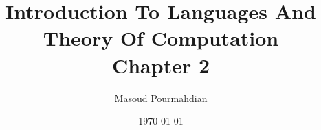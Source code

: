 \documentclass[notheorems, aspectratio=1610]{beamer}
\title{Introduction To Languages And Theory Of Computation \\ Chapter 2}
\date{\today}
\author{Masoud Pourmahdian}
\begin{document}
\small




% 
% 
% 
% 
% 
% 
% 
% 
% 
% 
% 
% 


\end{document}
